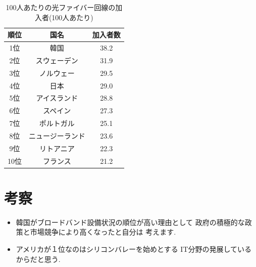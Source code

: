 \documentclass[a4paper,11pt,dvipdfmx]{ujarticle}
\begin{document}
\begin{table}[htbp]
    \centering
    \caption{100人あたりの光ファイバー回線の加入者(100人あたり)}
    \label{tbl:利用状況}

    \begin{tabular}{|c|c|c|}\hline
        順位 & 国名 & 加入者数 \\
        \hline
        1位 & 韓国 & 38.2\\
        \hline
        2位 & スウェーデン & 31.9\\
        \hline
        3位 & ノルウェー & 29.5\\
        \hline
        4位 & 日本 & 29.0\\
        \hline
        5位 & アイスランド & 28.8\\
        \hline
        6位 & スペイン & 27.3\\
        \hline 
        7位 & ポルトガル & 25.1\\
        \hline
        8位 & ニュージーランド & 23.6\\
        \hline
        9位 & リトアニア & 22.3\\
        \hline 
        10位 & フランス &21.2\\
        \hline
    \end{tabular}
\end{table}

\section{考察}

\begin{itemize}
    \item 韓国がブロードバンド設備状況の順位が高い理由として
政府の積極的な政策と市場競争により高くなったと自分は
考えます.
    \item アメリカが１位なのはシリコンバレーを始めとする
IT分野の発展しているからだと思う.
\end{itemize}


\end{document}
